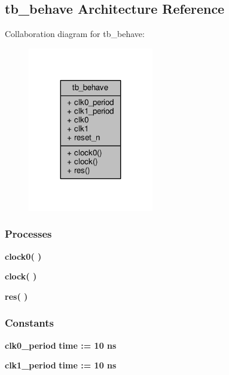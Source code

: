 \subsection{tb\+\_\+behave Architecture Reference}
\label{classtxiqmux__tb_1_1tb__behave}


Collaboration diagram for tb\+\_\+behave\+:\nopagebreak
\begin{figure}[H]
\begin{center}
\leavevmode
\includegraphics[width=155pt]{d6/dc2/classtxiqmux__tb_1_1tb__behave__coll__graph}
\end{center}
\end{figure}
\subsubsection*{Processes}
 \begin{DoxyCompactItemize}
\item 
{\bf clock0}{\bfseries  (  )}
\item 
{\bf clock}{\bfseries  (  )}
\item 
{\bf res}{\bfseries  (  )}
\end{DoxyCompactItemize}
\subsubsection*{Constants}
 \begin{DoxyCompactItemize}
\item 
{\bf clk0\+\_\+period} {\bfseries \textcolor{comment}{time}\textcolor{vhdlchar}{ }\textcolor{vhdlchar}{ }\textcolor{vhdlchar}{\+:}\textcolor{vhdlchar}{=}\textcolor{vhdlchar}{ }\textcolor{vhdlchar}{ }\textcolor{vhdlchar}{ } \textcolor{vhdldigit}{10} \textcolor{vhdlchar}{ }\textcolor{vhdlchar}{ns}\textcolor{vhdlchar}{ }} 
\item 
{\bf clk1\+\_\+period} {\bfseries \textcolor{comment}{time}\textcolor{vhdlchar}{ }\textcolor{vhdlchar}{ }\textcolor{vhdlchar}{\+:}\textcolor{vhdlchar}{=}\textcolor{vhdlchar}{ }\textcolor{vhdlchar}{ }\textcolor{vhdlchar}{ } \textcolor{vhdldigit}{10} \textcolor{vhdlchar}{ }\textcolor{vhdlchar}{ns}\textcolor{vhdlchar}{ }} 
\end{DoxyCompactItemize}
